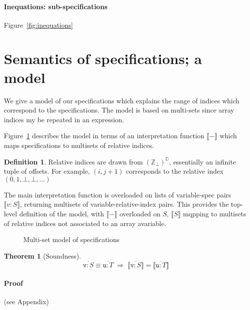 \documentclass[9pt]{sigplanconf}
\newcounter{block}
\theoremstyle{definition}
\newtheorem{theorem}[block]{Theorem}
\newtheorem{definition}[block]{Definition}
\newcommand{\interp}[1]{\llbracket{#1}\rrbracket}
\begin{document}
\paragraph{Inequations: sub-specifications}

Figure~\ref{fig:inequations} 

\section{Semantics of specifications; a model}
\label{sec:semantics}

\newcommand{\relix}{(\mathbb{Z}_\bot)^\mathbb{D}}

We give a model of our specifications which explains
the range of indices which correspond to the specifications.
The model is based on multi-sets since array indices my be repeated
in an expression.

Figure~\ref{fig:model} describes the model in terms of
an interpretation function $\interp{-}$ which maps specifications
to multisets of relative indices.

\begin{definition}Relative indices are drawn
from $(\mathbb{Z}_{\bot})^{\mathbb{D}}$, essentially an infinite
tuple of offsets. For example, $(i, j+1)$ corresponds to
the relative index $(0, 1, \bot, \bot, \ldots)$
\end{definition}

The main interpretation function is overloaded on lists of
variable-spec pairs $\interp{\overline{v : S}}$,
returning multisets of variable-relative-index pairs. This provides
the top-level definition of the model, with $\interp{-}$ overloaded
on $S$, $\interp{S}$ mqpping to multisets of
relative indices not associated to an array avariable.

\begin{figure}

\caption{Multi-set model of specifications}
\label{fig:model}
\end{figure}

\begin{theorem}[Soundness]
\[
\overline{\texttt{v} : S}\equiv \overline{\texttt{u} : T}
\; \Rightarrow \;
\interp{\overline{\texttt{v} : S}} = \interp{\overline{\texttt{u} : T}}
\]
\end{theorem}

\paragraph{Proof} (see Appendix)
\end{document}
